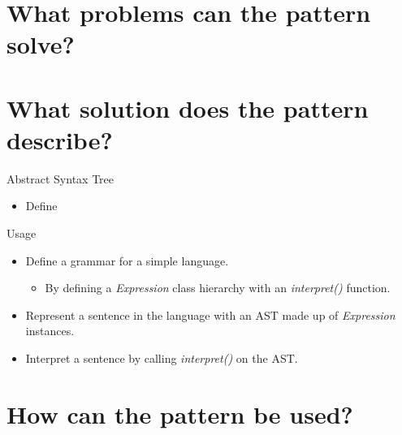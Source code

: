     \section{What problems can the pattern solve?}

    \begin{frame}
    \end{frame}


    \section{What solution does the pattern describe?}

    \begin{frame}{Abstract Syntax Tree}
        \begin{itemize}
            \item Define
        \end{itemize}
    \end{frame}

    \begin{frame}{Usage}
        \begin{itemize}
            \item Define a grammar for a simple language.
            \begin{itemize}
                \item By defining a \textit{Expression} class hierarchy with an \textit{interpret()} function.
            \end{itemize}
            \item Represent a sentence in the language with an AST made up of \textit{Expression} instances.
            \item Interpret a sentence by calling \textit{interpret()} on the AST.
        \end{itemize}
    \end{frame}

    \section{How can the pattern be used?}
    
